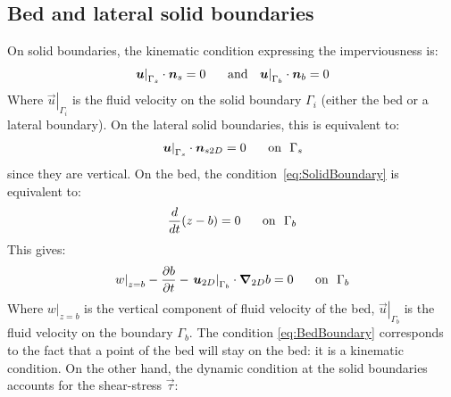 \subsection{Bed and lateral solid boundaries}\label{sec:solidBoundaries}

On solid boundaries, the kinematic condition expressing the imperviousness is:
\begin{align}
  \left.\vec{u}\right\rvert_{\Gamma_s}\cdot\vec{n}_s = 0\hspace{0.5cm}\text{ and ~} \left.\vec{u}\right\rvert_{\Gamma_b}\cdot\vec{n}_b = 0
  \label{eq:SolidBoundary}
\end{align}
Where $\left.\vec{u}\right\rvert_{\Gamma_i}$ is the fluid velocity on the solid boundary $\Gamma_i$
(either the bed or a lateral boundary).
On the lateral solid boundaries, this is equivalent to:
\begin{align}
  \left.\vec{u}\right\rvert_{\Gamma_s}\cdot\vec{n}_{s2D} = 0\hspace{0.5cm}\text{ on ~}\Gamma_s
  \label{eq:LatSolidBoundary}
\end{align}
since they are vertical.
On the bed, the condition~\eqref{eq:SolidBoundary} is equivalent to:
\begin{align}
  \dfrac{d}{dt}(z-b)=0\hspace{0.5cm}\text{ on ~}\Gamma_b
\end{align}
This gives:
\begin{align}
  \left.w\right\rvert_{z=b} - \dfrac{\partial b}{\partial t} - \left.\vec{u}_{2D}\right\rvert_{\Gamma_b}\cdot\Grad_{2D} b = 0\hspace{0.5cm}\text{ on ~}\Gamma_b
  \label{eq:BedBoundary}
\end{align}
Where $\left.w\right\rvert_{z=b}$ is the vertical component of fluid velocity of the bed, $\left.\vec{u}\right\rvert_{\Gamma_b}$ is the fluid velocity on the boundary $\Gamma_b$.
The condition \eqref{eq:BedBoundary} corresponds to the fact that a point of the bed will stay on the bed:
it is a kinematic condition.
On the other hand, the dynamic condition at the solid boundaries accounts for the shear-stress $\vec{\tau}$:
